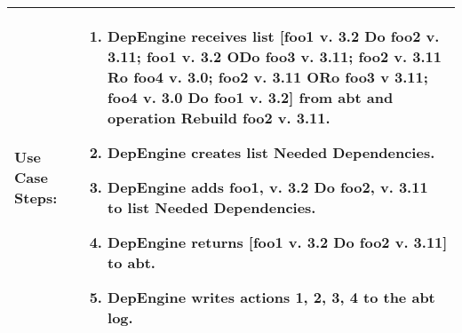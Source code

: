 \begin{tabularx}{\linewidth}{|l|X|}
\\
\hline 
\textbf{Use Case Steps:} & 
\begin{minipage}{\linewidth} 
  \vspace{0.05em}
  \begin{enumerate}
  \item DepEngine receives list [foo1 v. 3.2 Do foo2 v. 3.11; foo1 v. 3.2 ODo foo3 v. 3.11; foo2 v. 3.11 Ro foo4 v. 3.0; foo2 v. 3.11 ORo foo3 v 3.11; foo4 v. 3.0 Do foo1 v. 3.2] from abt and operation Rebuild foo2 v. 3.11.
 \item DepEngine creates list Needed Dependencies.
  \item DepEngine adds foo1, v. 3.2 Do foo2, v. 3.11 to list Needed Dependencies.
  \item DepEngine returns [foo1 v. 3.2 Do foo2 v. 3.11] to abt.
  \item DepEngine writes actions 1, 2, 3, 4 to the abt log.
    \end{enumerate}

  \vspace{0.05em}
\end{minipage}
\\
\hline 
\end{tabularx}
\newpage

